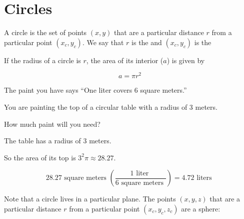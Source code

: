 \chapter{Circles}

A circle is the set of points $(x, y)$ that are a particular distance $r$ from a
particular point $(x_c, y_c)$.  We say that $r$ is the
 and $(x_c, y_c)$ is the 


\begin{mdframed}[style=important, frametitle={Area and Radius}]

  If the radius of a circle is $r$, the area of its interior ($a$) is given by 

  $$a = \pi r^2$$

\end{mdframed}

\begin{Exercise}[title={Area of a Circle}, label=area_of_circle]

  The paint you have says ``One liter covers 6 square meters.''

  You are painting the top of a circular table with a radius of 3 meters.

  How much paint will you need?
  
\end{Exercise}
\begin{Answer}[ref=area_of_circle]

  The table has a radius of 3 meters.

  So the area of its top is $3^2 \pi \approx 28.27$.

  $$ 28.27 \text{ square meters }\left(\frac{1 \text{ liter }}{6 \text{ square meters }} \right) = 4.72 \text{ liters }$$ 
  
\end{Answer}


Note that a circle lives in a particular plane. The points $(x, y, z)$ that are a particular distance $r$ from a
particular point $(x_c, y_c, z_c)$ are a sphere:

